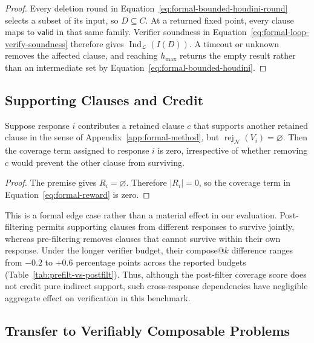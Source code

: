 \begin{proof}
Every deletion round in Equation~\eqref{eq:formal-bounded-houdini-round}
selects a subset of its input, so \(D\subseteq C\).  At a returned fixed point,
every clause maps to \(\mathsf{valid}\) in that same family.  Verifier
soundness in Equation~\eqref{eq:formal-loop-verify-soundness} therefore gives
\(\operatorname{Ind}_{\mathcal L}(I(D))\).  A timeout or unknown removes the
affected clause, and reaching \(h_{\max}\) returns the empty result rather
than an intermediate set by Equation~\eqref{eq:formal-bounded-houdini}.
\end{proof}

\subsection{Supporting Clauses and Credit}

\begin{proposition}
\label{prop:support-credit}
Suppose response \(i\) contributes a retained clause \(c\) that supports
another retained clause in the sense of Appendix~\ref{app:formal-method}, but
\(\operatorname{rej}_{\mathcal N}(V_i)=\varnothing\).  Then the coverage
term assigned to response \(i\) is zero, irrespective of whether removing
\(c\) would prevent the other clause from surviving.
\end{proposition}

\begin{proof}
The premise gives \(R_i=\varnothing\).  Therefore \(|R_i|=0\), so the
coverage term in Equation~\eqref{eq:formal-reward} is zero.
\end{proof}

This is a formal edge case rather than a material effect in our evaluation.
Post-filtering permits supporting clauses from different responses to survive
jointly, whereas pre-filtering removes clauses that cannot survive within
their own response.  Under the longer verifier budget, their compose@\(k\)
difference ranges from \(-0.2\) to \(+0.6\) percentage points across the
reported budgets (Table~\ref{tab:prefilt-vs-postfilt}).  Thus, although the
post-filter coverage score does not credit pure indirect support, such
cross-response dependencies have negligible aggregate effect on verification
in this benchmark.

\subsection{Transfer to Verifiably Composable Problems}

